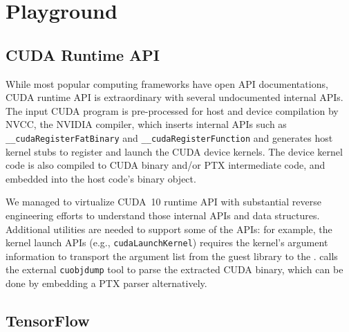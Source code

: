 
\section*{Playground}

\subsection{CUDA Runtime API}

While most popular computing frameworks have open API documentations,
CUDA runtime API is extraordinary with several undocumented internal APIs.
The input CUDA program is pre-processed for host and device compilation by NVCC,
the NVIDIA compiler,
which inserts internal APIs such as \lstinline|__cudaRegisterFatBinary|
and \lstinline|__cudaRegisterFunction| and generates host kernel stubs to register and
launch the CUDA device kernels.
The device kernel code is also compiled to CUDA binary and/or PTX intermediate code,
and embedded into the host code's binary object.

We managed to virtualize CUDA~10 runtime API with substantial reverse engineering efforts
to understand those internal APIs and data structures.
Additional utilities are needed to support some of the APIs:
for example, the kernel launch APIs (e.g., \lstinline|cudaLaunchKernel|)
requires the kernel's argument information to transport the argument list from the guest library to the \worker.
\AvA calls the external \lstinline|cuobjdump| tool to parse the extracted CUDA binary,
which can be done by embedding a PTX parser alternatively.


\subsection{TensorFlow}

